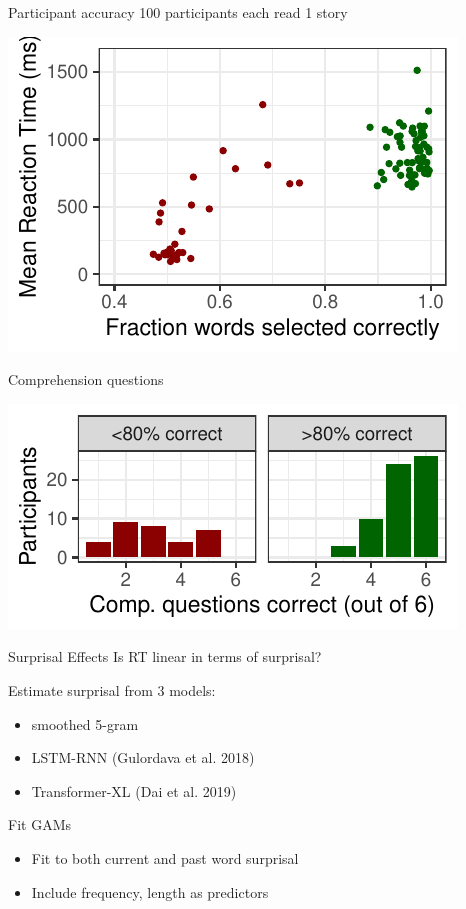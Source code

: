 \documentclass[ 12pt, xcolor=beamer,table,usenames,dvipsnames, ignorenonframetext, ngerman]{beamer}
\begin{document}
\begin{frame}{Participant accuracy}
100 participants each read 1 story \pause
\begin{center}
\includegraphics[width=.8\textwidth]{../Images/error.pdf}
\end{center}
\end{frame}
\begin{frame}{Comprehension questions}
\begin{center} \pause
\includegraphics[width=.8\textwidth]{../Images/comp.pdf}
\end{center}
\end{frame}



\begin{frame}{Surprisal Effects}
	\large{Is RT linear in terms of surprisal?}\pause
	\medskip
	
	Estimate surprisal from 3 models:
	\begin{itemize}
		\item smoothed 5-gram
		\item LSTM-RNN (Gulordava et al. 2018)
		\item Transformer-XL (Dai et al. 2019)
	\end{itemize}
	
	\pause
	
	Fit GAMs
	\begin{itemize}
		\item Fit to both current and past word surprisal
		\item Include frequency, length as predictors
	\end{itemize}
	
\end{frame}
\end{document}
